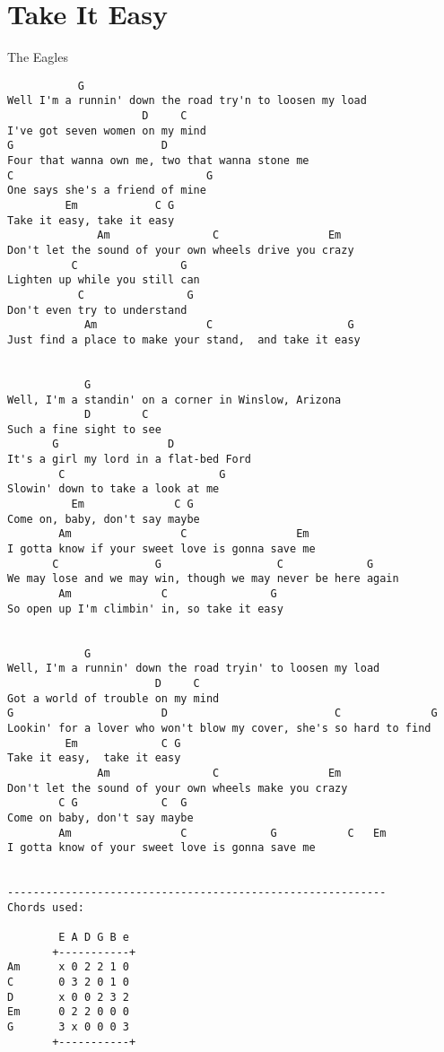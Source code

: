 \section{Take It Easy} \label{sec:song4}
The Eagles
\begin{verbatim}
           G                         
Well I'm a runnin' down the road try'n to loosen my load
                     D     C
I've got seven women on my mind
G                       D
Four that wanna own me, two that wanna stone me
C                              G
One says she's a friend of mine
         Em            C G
Take it easy, take it easy
              Am                C                 Em
Don't let the sound of your own wheels drive you crazy
          C                G
Lighten up while you still can
           C                G
Don't even try to understand
            Am                 C                     G
Just find a place to make your stand,  and take it easy


            G
Well, I'm a standin' on a corner in Winslow, Arizona
            D        C
Such a fine sight to see
       G                 D
It's a girl my lord in a flat-bed Ford
        C                        G
Slowin' down to take a look at me
          Em              C G
Come on, baby, don't say maybe
        Am                 C                 Em
I gotta know if your sweet love is gonna save me
       C               G                  C             G
We may lose and we may win, though we may never be here again
        Am              C                G
So open up I'm climbin' in, so take it easy


            G
Well, I'm a runnin' down the road tryin' to loosen my load
                       D     C
Got a world of trouble on my mind
G                       D                          C              G
Lookin' for a lover who won't blow my cover, she's so hard to find
         Em             C G
Take it easy,  take it easy
              Am                C                 Em
Don't let the sound of your own wheels make you crazy
        C G             C  G
Come on baby, don't say maybe
        Am                 C             G           C   Em   
I gotta know of your sweet love is gonna save me


-----------------------------------------------------------
Chords used:

        E A D G B e
       +-----------+
Am      x 0 2 2 1 0
C       0 3 2 0 1 0
D       x 0 0 2 3 2
Em      0 2 2 0 0 0
G       3 x 0 0 0 3
       +-----------+
\end{verbatim}

